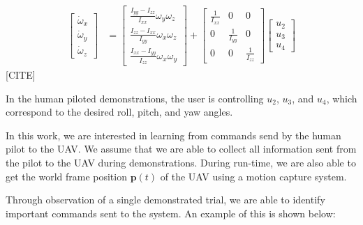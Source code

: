 \documentclass[letterpaper, 10 pt, conference]{ieeeconf}  %
\begin{document}
\begin{equation}
\begin{aligned}
	\begin{bmatrix}\dot{\omega}_{x} \\ \dot{\omega}_{y} \\ \dot{\omega}_{z}\end{bmatrix} &= \begin{bmatrix}\frac{I_{yy} - I_{zz}}{I_{xx}} \omega_{y}\omega_{z}\\ \frac{I_{zz} - I_{xx}}{I_{yy}} \omega_{x}\omega_{z} \\ \frac{I_{xx} - I_{yy}}{I_{zz}} \omega_{x}\omega_{y} \end{bmatrix} +  \begin{bmatrix}\frac{1}{I_{xx}} & 0 & 0\\ 0 & \frac{1}{I_{yy}} & 0\\ 0 & 0 & \frac{1}{I_{zz}}\end{bmatrix} \begin{bmatrix}u_{2} \\ u_{3} \\ u_{4} \end{bmatrix}
	\end{aligned}
	\label{eq:quadrotor_dynamics} \nonumber
\end{equation} [CITE]

In the human piloted demonstrations, the user is controlling $u_2$, $u_3$, and $u_4$, which correspond to the desired roll, pitch, and yaw angles.

In this work, we are interested in learning from commands send by the human pilot to the UAV. We assume that we are able to collect all information sent from the pilot to the UAV during demonstrations. During run-time, we are also able to get the world frame position $\mathbf{p}(t)$ of the UAV using a motion capture system.

Through observation of a single demonstrated trial, we are able to identify important commands sent to the system. An example of this is shown below:
\end{document}

